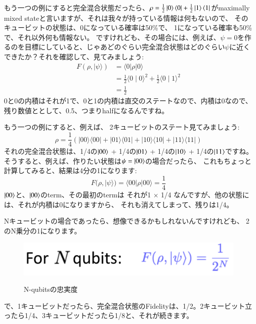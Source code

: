もう一つの例にすると完全混合状態だったら、$
\rho= \frac{1}{2}\ket{0}\bra{0} + \frac{1}{2}\ket{1}\bra{1}$がmaximally mixed stateと言いますが、それは我々が持っている情報は何もないので、
そのキュービットの状態は、0になっている確率は50\%で、
1になっている確率も50\%で、それ以外何も情報ない。
ですけれども、その場合には、例えば、$\psi=0$を作るのを目標にしていると、じゃあどのぐらい完全混合状態はどのぐらい$\psi$に近くできたか？それを確認して、見てみましょう:
\begin{equation}
\begin{aligned}
F(\rho,|\psi\rangle) &=\langle 0|\rho| 0\rangle \\
&=\frac{1}{2}\langle 0 \mid 0\rangle^{2}+\frac{1}{2}\langle 0 \mid 1\rangle^{2} \\
&=\frac{1}{2}
\end{aligned}
\end{equation}
0と0の内積はそれが1で、0と1の内積は直交のステートなので、内積は0なので、残り数値ととして、0.5、つまりhalfになるんですね。

もう一つの例にすると、例えば、
2キュービットのステート見てみましょう:
\begin{equation}
\rho=\frac{1}{4}(|00\rangle\langle 00|+| 01\rangle\langle 01|+| 10\rangle\langle 10|+| 11\rangle\langle 11|)
\end{equation}
それの完全混合状態は、1/4の$\ket{00}$ + 1/4の$\ket{01}$ + 1/4の$\ket{10}$ + 1/4の$\ket{11}$ですね。
そうすると、例えば、作りたい状態は$\psi = \ket{00}$の場合だったら、
これもちょっと計算してみると、結果は4分の1になります:
\begin{equation}
F(\rho,|\psi\rangle)=\langle 00|\rho| 00\rangle=\frac{1}{4}
\end{equation}
$\ket{00}$と、$\ket{00}$のterm、その最初のtermは
それが1 × 1/4 なんですが、他の状態には、それが内積は0になりますから、
それも消えてしまって、残りは1/4。

Nキュービットの場合であったら、想像できるかもしれないんですけれども、
2のN乗分の1になります。
\begin{figure}[H]
    \centering
    \includegraphics[width=1.0\textwidth]{lesson3/N_qubits_relation.pdf}
    \label{fig: 1}
    \begin{center}
        \caption{N-qubitsの忠実度}
    \end{center}
\end{figure}
で、1キュービットだったら、完全混合状態のFidelityは、1/2。2キュービット立ったら1/4、3キュービットだったら1/8と、それが続きます。


